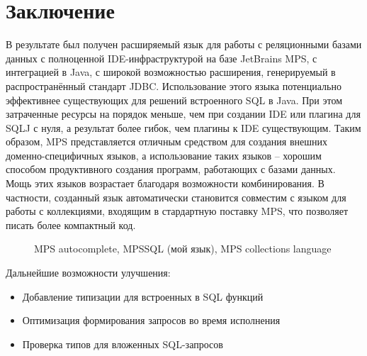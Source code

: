 \documentclass[12pt]{article}
\begin{document}
\section{Заключение}
В результате был получен расширяемый язык для работы с реляционными базами данных с полноценной IDE-инфраструктурой на базе JetBrains MPS, с интеграцией в Java, с широкой возможностью расширения, генерируемый в распространённый стандарт JDBC. Использование этого языка потенциально эффективнее существующих для решений встроенного SQL в Java. При этом затраченные ресурсы на порядок меньше, чем при создании IDE или плагина для SQLJ с нуля, а результат более гибок, чем плагины к IDE существующим. Таким образом, MPS представляется отличным средством для создания внешних доменно-специфичных языков, а использование таких языков -- хорошим способом продуктивного создания программ, работающих с базами данных. Мощь этих языков возрастает благодаря возможности комбинирования. В частности, созданный язык автоматически становится совместим с языком для работы с коллекциями, входящим в стардартную поставку MPS, что позволяет писать более компактный код.
\begin{figure}[h]
\caption{MPS autocomplete, MPSSQL (мой язык), MPS collections language}
\end{figure}

Дальнейшие возможности улучшения:
\begin{itemize}
\item Добавление типизации для встроенных в SQL функций
\item Оптимизация формирования запросов во время исполнения
\item Проверка типов для вложенных SQL-запросов
\end{itemize}
\end{document}
